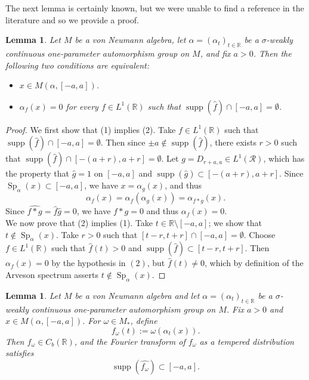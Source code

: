 \documentclass[12pt]{amsart}
\newtheorem{lem}[thm]{Lemma}
\theoremstyle{definition}
\newcommand{\R}{\mathbb{R}}
\def \R{\mathcal R}
\begin{document}
The next lemma is certainly known, but we were unable to find a reference in the literature and so we provide a proof.
\begin{lem}\label{lem Arvesonsp}
Let $M$ be a von Neumann algebra, let $\alpha=(\alpha_t)_{t\in\mathbb R}$ be a
$\sigma$-weakly continuous one-parameter automorphism group on $M$, and fix $a>0$. Then the following two conditions are equivalent: 
\begin{itemize}
    \item[{\rm (1)}] $x\in M(\alpha,[-a,a])$. 
    \item[{\rm (2)}] $\alpha_f(x)=0$ for every $f\in L^1(\mathbb R)$ such that $\operatorname{supp}(\hat{f})\cap [-a,a]=\emptyset$. 
\end{itemize}
\end{lem}
\begin{proof}
    We first show that (1) implies (2). Take $f\in L^1(\mathbb R)$ such that $\operatorname{supp}(\hat{f})\cap [-a,a]=\emptyset$. Then since $\pm a\notin \operatorname{supp}(\hat{f})$, there exists $r>0$ such that $\operatorname{supp}(\hat{f})\cap [-(a+r),a+r]=\emptyset$. Let $g=D_{r+a,a}\in L^1(\R)$, which has the property that $\hat{g}=1$ on $[-a,a]$ and $\operatorname{supp}(\hat{g})\subset [-(a+r),a+r]$. Since $\operatorname{Sp}_{\alpha}(x)\subset [-a,a]$, we have $x=\alpha_g(x)$, and thus 
    \[\alpha_f(x)=\alpha_f(\alpha_g(x))=\alpha_{f*g}(x).\]
    Since $\widehat{f*g}=\hat{f}\hat{g}=0$, we have $f*g=0$ and thus $\alpha_f(x)=0$.\\
    
    We now prove that (2) implies (1).  Take $t\in \mathbb{R}\setminus [-a,a]$; we show that $t\notin \operatorname{Sp}_{\alpha}(x)$. Take $r>0$ such that $[t-r,t+r]\cap [-a,a]=\emptyset$. Choose $f\in L^1(\mathbb{R})$ such that $\hat{f}(t)>0$ and $\operatorname{supp}(\hat{f})\subset [t-r,t+r]$. Then $\alpha_f(x)=0$ by the hypothesis in $(2)$, but $\hat{f}(t)\neq 0$, which by definition of the Arveson spectrum asserts $t\notin \operatorname{Sp}_{\alpha}(x)$.  
\end{proof}
\begin{lem}\label{lem arvesoncptspec}
Let $M$ be a von Neumann algebra and let $\alpha=(\alpha_t)_{t\in\mathbb R}$ be a
$\sigma$-weakly continuous one-parameter automorphism group on $M$.  Fix $a>0$ and
$x\in M(\alpha,[-a,a])$.  For $\omega\in M_*$, define
\[
f_\omega(t):=\omega(\alpha_t(x)).
\]
Then $f_\omega\in C_b(\mathbb R)$,
and the Fourier transform of $f_\omega$ as a tempered distribution satisfies
\[
\operatorname{supp}(\widehat{f_\omega})\subset [-a,a].
\]
\end{lem}
\end{document}
